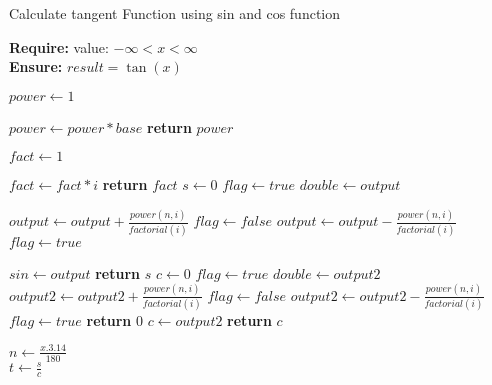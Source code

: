 \documentclass{article}
\begin{document}
\begin{algorithm}

\caption{Calculate tangent Function using sin and cos function}

\textbf{Require:}  value: $-\infty<x<\infty$\\
\textbf{Ensure:} $result = \tan(x)$
\begin{algorithmic}[1]

    \State $power \leftarrow 1$
    
    \State $power \leftarrow power * base$
    \EndFor
    \State \textbf{return} $power$
    \EndProcedure
\Statex

    \State $fact \leftarrow 1$
    
    \State $fact \leftarrow fact * i$
    \EndFor
    \State \textbf{return} $fact$
    \EndProcedure
\Statex
{}
\State $s \leftarrow 0$ 
\State $flag \leftarrow true$
\State $double \leftarrow output$
   
    \State $output \leftarrow output +\frac{power(n,i)}{factorial(i)}$
    \State $flag \leftarrow false$
  \Else
    \State $output \leftarrow output -\frac{power(n,i)}{factorial(i)}$
     \State$ flag \leftarrow true$
     
     \EndIf
    \EndFor
    \State $sin \leftarrow output$
    \State \textbf{return} $s$
    \EndProcedure
\Statex
{}
\State $c \leftarrow 0$ 
\State $flag \leftarrow true$
\State $double \leftarrow output2$
    \State $output2 \leftarrow output2 +\frac{power(n,i)}{factorial(i)}$
    \State $flag \leftarrow false$
  \Else
    \State $output2 \leftarrow output2 -\frac{power(n,i)}{factorial(i)}$
     \State$ flag \leftarrow true$
     \EndIf
     \Else 
     \State \textbf{return} 0
     \EndIf
    \EndFor
    \State $c \leftarrow output2$
    \State \textbf{return} $c$
    \EndProcedure
\Statex

\State $n \leftarrow \frac{x.3.14}{180}$\\
$t \leftarrow \frac{s}{c}$
\end{algorithmic}
\end{algorithm}
\end{document}
